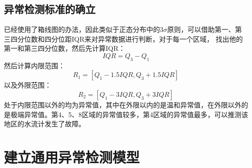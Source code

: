 \documentclass[UTF8]{article}
\begin{document}
		\subsection{异常检测标准的确立}
			已经使用了箱线图的办法，因此类似于正态分布中的3$\sigma$原则，可以借助第一、第三四分位数和四分位距IQR来对异常数据进行判断，对于每一个区域，
			找出他的第一和第三四分位数，然后先计算IQR：
			$$
			IQR=Q_3-Q_1
			$$
			然后计算内限范围：
			$$
			R_1=\left[ Q_1-1.5IQR,Q_3+1.5IQR \right] 
			$$
			以及外限范围：
			$$
			R_2=\left[ Q_1-3IQR,Q_3+3IQR \right] 
			$$
			处于内限范围以外的均为异常值，其中在外限以内的是温和异常值，在外限以外的是极端异常值。第4、5、8区域的异常值较多，第4区域的异常值最多，可以推测该地区的水流计发生了故障。
	\section{建立通用异常检测模型}
\end{document}
